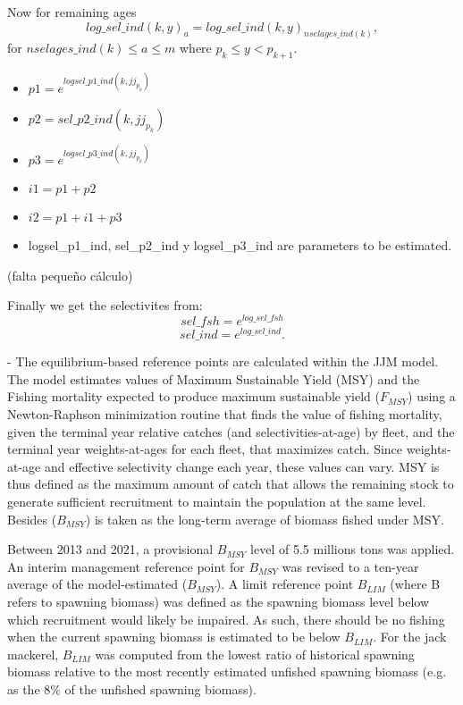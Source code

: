 \documentclass{article}
\begin{document}
\begin{itemize}
    Now for remaining ages
    \begin{equation}
         log\_sel\_ind(k,y)_a = log\_sel\_ind(k,y)_{nselages\_ind(k)},
    \end{equation}
    for $nselages\_ind(k)\leq a \leq m$ where $p_k\leq y < p_{k+1}$.
\begin{itemize}
    \item $p1 = e^{logsel\_p1\_ind(k,jj_{p_k})}$
    \item $p2 = sel\_p2\_ind(k,jj_{p_k})$
    \item $p3 = e^{logsel\_p3\_ind(k,jj_{p_k})}$
    \item $i1 = p1 + p2$
    \item $i2 = p1 + i1 + p3$
    \item logsel\_p1\_ind, sel\_p2\_ind y logsel\_p3\_ind are parameters to be estimated.
\end{itemize}

 (falta pequeño cálculo)   
\end{itemize}
Finally we get the selectivites from:
\begin{equation}
    sel\_fsh=e^{log\_sel\_fsh}
\end{equation}
\begin{equation}
    sel\_ind=e^{log\_sel\_ind}.
\end{equation}

- The equilibrium-based reference points are calculated within the JJM model. The model estimates values of Maximum Sustainable Yield (MSY) and the Fishing mortality expected to produce maximum sustainable yield (\(F_{MSY}\)) using a Newton-Raphson minimization routine that finds the value of fishing mortality, given the terminal year relative catches (and selectivities-at-age) by fleet,  and the terminal year weights-at-ages for each fleet, that maximizes catch. Since weights-at-age and effective selectivity change each year, these values can vary. MSY is thus defined as the maximum amount of catch that allows the remaining stock to generate sufficient recruitment to maintain the population at the same level. Besides (\(B_{MSY}\)) is taken as the long-term average of biomass fished under MSY.

Between 2013 and 2021, a provisional \(B_{MSY}\) level of 5.5 millions tons was applied. 
An interim management reference point for \(B_{MSY}\) was revised to a ten-year average of the model-estimated (\(B_{MSY}\)). 
A limit reference point \(B_{LIM}\) (where B refers to spawning biomass) was defined as the spawning biomass level below which recruitment would likely be impaired. As such, there should be no fishing when the current spawning biomass is estimated to be below \(B_{LIM}\).
For the jack mackerel, \(B_{LIM}\) was computed from the lowest ratio of historical spawning biomass relative to the most recently estimated unfished spawning biomass (e.g. as the 8\% of the unfished spawning biomass).\\
\end{document}

